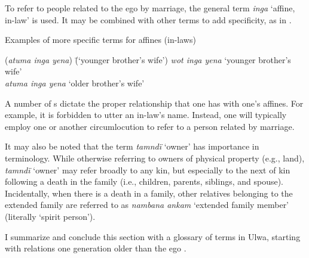   To refer to people related to the ego by marriage, the general term \textit{inga} ‘affine, in-law’ is used. It may be combined with other  terms to add specificity, as in .

\ea%
    \label{ex:sem:25}
          Examples of more specific terms for affines (in-laws)
\begin{tabbing}          
{(\textit{atuma inga yena})} \= {(‘younger brother’s wife’)}\kill
{\textit{wot inga yena}} \> {‘younger brother’s wife’}\\
{\textit{atuma inga yena}} \> {‘older brother’s wife’}
\end{tabbing}
\z

A number of s dictate the proper relationship that one has with one’s affines. For example, it is forbidden to utter an in-law’s name. Instead, one will typically employ one or another circumlocution to refer to a person related by marriage.

  It may also be noted that the term \textit{tamndï} ‘owner’ has importance in  terminology. While otherwise referring to owners of physical property (e.g., land), \textit{tamndï} ‘owner’ may refer broadly to any kin, but especially to the next of kin following a death in the family (i.e., children, parents, siblings, and spouse). Incidentally, when there is a death in a family, other relatives belonging to the extended family are referred to as \textit{nambana ankam} ‘extended family member’ (literally ‘spirit person’).

  I summarize and conclude this section with a glossary of  terms in Ulwa, starting with relations one generation older than the ego .

